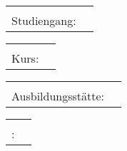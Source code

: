 \begin{tabular}{rl}
	\hspace{0.45\textwidth} &                       \\
	Studiengang: & \CSTUDIENGANG
\end{tabular}

\begin{tabular}{rl}
	\hspace{0.45\textwidth} &       \\
	       Kurs: & \CKURS
\end{tabular}

\begin{tabular}{rl}
	\hspace{0.45\textwidth} &          \\
	Ausbildungsstätte: & \CBETRIEB
\end{tabular}

\begin{tabular}{rl}
	\hspace{0.45\textwidth} &          \\
	\BETREUER: & \CBETREUER
\end{tabular}

\vspace*{\fill}

\pagebreak
